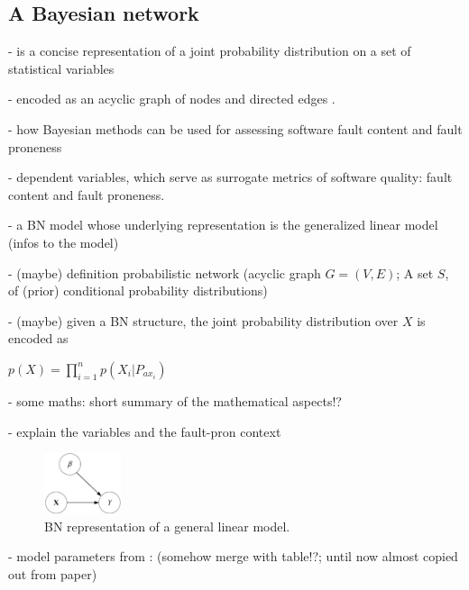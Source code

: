 \subsection{A Bayesian network}

- is a concise representation of a joint probability distribution on a set of statistical variables

- encoded as an acyclic graph of nodes and directed edges \cite{b9pai2007empirical}. 

- how Bayesian methods can be used for assessing software fault content and fault proneness

- dependent variables, which serve as surrogate metrics of software quality: fault content and fault proneness.

- a BN model whose underlying representation is the generalized linear model (infos to the model)

- (maybe) definition probabilistic network (acyclic graph $G=(V,E)$; A set $S$, of (prior) conditional probability distributions)

- (maybe) given a BN structure, the joint probability distribution over $X$ is encoded as

\begin{math}
	p(X)= \prod_{i=1}^{n}p(X_i|P_{ax_i})
\end{math}

- some maths: short summary of the mathematical aspects!?

- explain the variables and the fault-pron context

\begin{figure}[htbp]
	\centerline{\includegraphics[width=0.2\textwidth]{pictures/bn1.png}}
	\caption{BN representation of a general linear model.}
	\label{fig1bn}
\end{figure}

- model parameters from \cite{b9pai2007empirical}: (somehow merge with table!?; until now almost copied out from paper)

